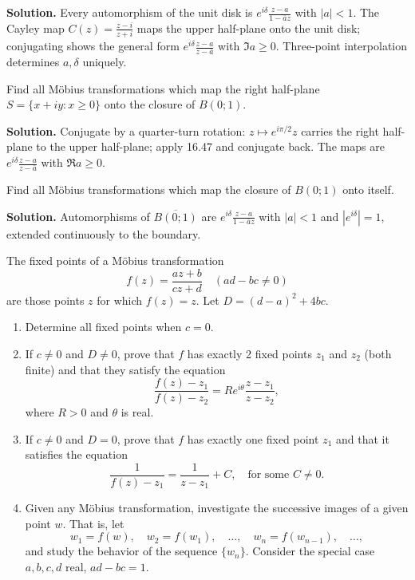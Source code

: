 \noindent\textbf{Solution.}
Every automorphism of the unit disk is $e^{i\delta}\frac{z-a}{1-\bar a z}$ with $|a|<1$. The Cayley map $C(z)=\frac{z-i}{z+i}$ maps the upper half-plane onto the unit disk; conjugating shows the general form $e^{i\delta}\frac{z-a}{z-\bar a}$ with $\Im a\ge0$. Three-point interpolation determines $a,\delta$ uniquely.

\begin{problembox}
Find all Möbius transformations which map the right half-plane \( S = \{ x + i y : x \geq 0 \} \) onto the closure of \( B(0; 1) \).
\end{problembox}

\noindent\textbf{Solution.}
Conjugate by a quarter-turn rotation: $z\mapsto e^{i\pi/2}z$ carries the right half-plane to the upper half-plane; apply 16.47 and conjugate back. The maps are $e^{i\delta}\frac{z-a}{z-\bar a}$ with $\Re a\ge0$.

\begin{problembox}
Find all Möbius transformations which map the closure of \( B(0; 1) \) onto itself.
\end{problembox}

\noindent\textbf{Solution.}
Automorphisms of $\overline{B(0;1)}$ are $e^{i\delta}\frac{z-a}{1-\bar a z}$ with $|a|<1$ and $|e^{i\delta}|=1$, extended continuously to the boundary.

\begin{problembox}
The fixed points of a Möbius transformation
\[ f(z) = \frac{a z + b}{c z + d} \quad (ad - bc \neq 0) \]
are those points \( z \) for which \( f(z) = z \). Let \( D = (d - a)^2 + 4bc \).
\begin{enumerate}[label=(\alph*)]
\item Determine all fixed points when \( c = 0 \).
\item If \( c \neq 0 \) and \( D \neq 0 \), prove that \( f \) has exactly 2 fixed points \( z_1 \) and \( z_2 \) (both finite) and that they satisfy the equation
\[ \frac{f(z) - z_1}{f(z) - z_2} = R e^{i \theta} \frac{z - z_1}{z - z_2}, \]
where \( R > 0 \) and \( \theta \) is real.
\item If \( c \neq 0 \) and \( D = 0 \), prove that \( f \) has exactly one fixed point \( z_1 \) and that it satisfies the equation
\[ \frac{1}{f(z) - z_1} = \frac{1}{z - z_1} + C, \quad \text{for some } C \neq 0. \]
\item Given any Möbius transformation, investigate the successive images of a given point \( w \). That is, let
\[ w_1 = f(w), \quad w_2 = f(w_1), \quad \ldots, \quad w_n = f(w_{n-1}), \quad \ldots, \]
and study the behavior of the sequence \( \{ w_n \} \). Consider the special case \( a, b, c, d \) real, \( ad - bc = 1 \).
\end{enumerate}
\end{problembox}

